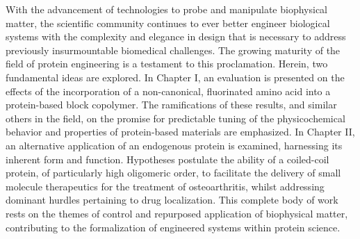 % 
% 
%
With the advancement of technologies to probe and manipulate biophysical matter,
the scientific community continues to ever better engineer biological systems with the
complexity and elegance in design that is necessary to address previously
insurmountable biomedical challenges. The growing maturity of the field of
protein engineering is a testament to this proclamation.
Herein, two fundamental ideas are explored. In Chapter I, an evaluation is
presented on the effects of the incorporation of a non-canonical, fluorinated amino
acid into a protein-based block copolymer. The ramifications of these results,
and similar others in the field, on the promise for predictable tuning of the
physicochemical behavior and properties of protein-based materials are
emphasized.
In Chapter II, an alternative application of an endogenous protein is
examined, harnessing its inherent form and function. Hypotheses postulate
the ability of a coiled-coil protein, of particularly high oligomeric order, to
facilitate the delivery of small molecule therapeutics for the treatment of
osteoarthritis, whilst addressing dominant hurdles pertaining to drug
localization.
This complete body of work rests on the themes of control and repurposed
application of biophysical matter, contributing to the formalization of
engineered systems within protein science.
